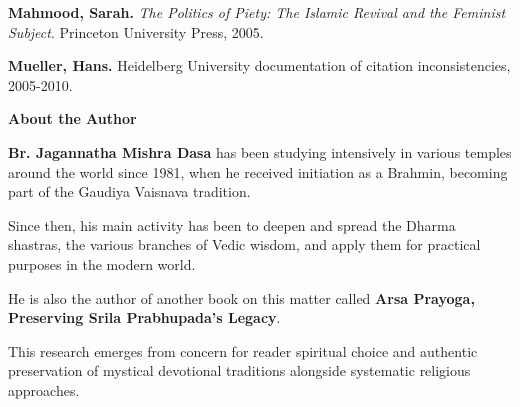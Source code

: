 \documentclass[11pt,twoside]{book}
\begin{document}
\textbf{\textbf{Mahmood, Sarah.}} \emph{The Politics of Piety: The Islamic Revival and the Feminist Subject}. Princeton University Press, 2005.

\textbf{\textbf{Mueller, Hans.}} Heidelberg University documentation of citation inconsistencies, 2005-2010.



\clearpage
\pagestyle{sectionopening}
\thispagestyle{sectionopening}
\markboth{}{}
\markright{}
\vspace*{0.25\textheight}
\begin{center}
{\Huge\bfseries About the Author}
\end{center}

\textbf{\textbf{Br. Jagannatha Mishra Dasa}} has been studying intensively in various temples around the world since 1981, when he received initiation as a Brahmin, becoming part of the Gaudiya Vaisnava tradition.

Since then, his main activity has been to deepen and spread the Dharma shastras, the various branches of Vedic wisdom, and apply them for practical purposes in the modern world. 

He is also the author of another book on this matter called \textbf{Arsa Prayoga, Preserving Srila Prabhupada's Legacy}.

This research emerges from concern for reader spiritual choice and authentic preservation of mystical devotional traditions alongside systematic religious approaches.
\end{document}
